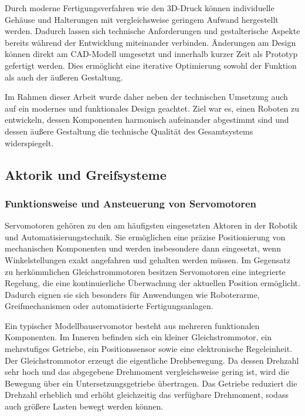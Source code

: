 Durch moderne Fertigungsverfahren wie den 3D-Druck können individuelle Gehäuse und Halterungen mit vergleichsweise geringem Aufwand hergestellt werden. Dadurch lassen sich technische Anforderungen und gestalterische Aspekte bereits während der Entwicklung miteinander verbinden. Änderungen am Design können direkt am CAD-Modell umgesetzt und innerhalb kurzer Zeit als Prototyp gefertigt werden. Dies ermöglicht eine iterative Optimierung sowohl der Funktion als auch der äußeren Gestaltung.

Im Rahmen dieser Arbeit wurde daher neben der technischen Umsetzung auch auf ein modernes und funktionales Design geachtet. Ziel war es, einen Roboten zu entwickeln, dessen Komponenten harmonisch aufeinander abgestimmt sind und dessen äußere Gestaltung die technische Qualität des Gesamtsystems widerspiegelt.

\subsection{Aktorik und Greifsysteme}

\subsubsection*{Funktionsweise und Ansteuerung von Servomotoren}

Servomotoren gehören zu den am häufigsten eingesetzten Aktoren in der Robotik und Automatisierungstechnik. Sie ermöglichen eine präzise Positionierung von mechanischen Komponenten und werden insbesondere dann eingesetzt, wenn Winkelstellungen exakt angefahren und gehalten werden müssen. Im Gegensatz zu herkömmlichen Gleichstrommotoren besitzen Servomotoren eine integrierte Regelung, die eine kontinuierliche Überwachung der aktuellen Position ermöglicht. Dadurch eignen sie sich besonders für Anwendungen wie Roboterarme, Greifmechanismen oder automatisierte Fertigungsanlagen. \cite{Kollmorgen.2024}

Ein typischer Modellbauservomotor besteht aus mehreren funktionalen Komponenten. Im Inneren befinden sich ein kleiner Gleichstrommotor, ein mehrstufiges Getriebe, ein Positionssensor sowie eine elektronische Regeleinheit. Der Gleichstrommotor erzeugt die eigentliche Drehbewegung. Da dessen Drehzahl sehr hoch und das abgegebene Drehmoment vergleichsweise gering ist, wird die Bewegung über ein Untersetzungsgetriebe übertragen. Das Getriebe reduziert die Drehzahl erheblich und erhöht gleichzeitig das verfügbare Drehmoment, sodass auch größere Lasten bewegt werden können.

